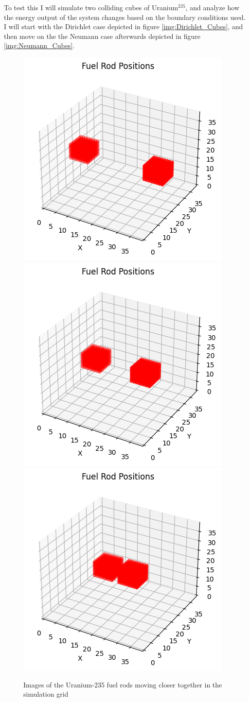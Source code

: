\documentclass[letterpaper, 12pt]{article}
\begin{document}
         To test this I will simulate two colliding cubes of Uranium$^{235}$, and analyze how the energy output of the system changes based on the boundary conditions used. I will start with the Dirichlet case depicted in figure \ref{img:Dirichlet_Cubes}, and then move on the the Neumann case afterwards depicted in figure \ref{img:Neumann_Cubes}.
         \begin{figure}[h!]
            \centering
            \includegraphics[width=0.3\linewidth]{Graphs/Graph_FuelRodsInGrid.png}
            \includegraphics[width=0.3\linewidth]{Graphs/Graph_FuelRodInGrid_Middle.png}
            \includegraphics[width=0.3\linewidth]{Graphs/GraphFuelRodInGrid_Close.png}
            \caption{Images of the Uranium-235 fuel rods moving closer together in the simulation grid}
            \label{img:CubesInGrid}
         \end{figure}
\end{document}
